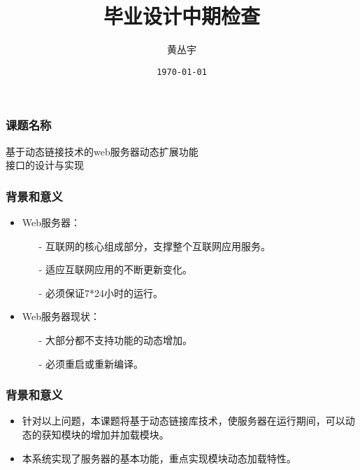 \documentclass[dvipdfm]{beamer}
\begin{document}
\title{毕业设计中期检查}
\author{黄丛宇}
\date{\texttt{\today}}

\begin{frame}	
	\titlepage
\end{frame}

\begin{frame}
	\frametitle{课题名称}	
	\begin{center}
	{\Large
			基于动态链接技术的{\cp web}服务器动态扩展功能\\
				接口的设计与实现
	}
	\end{center}
\end{frame}

\begin{frame}
	\frametitle{背景和意义}
	\begin{itemize}
		\item {\cp Web}服务器：
			\begin{itemize}
				\item[-] 互联网的核心组成部分，支撑整个互联网应用服务。
				\item[-] 适应互联网应用的不断更新变化。
				\item[-] 必须保证7*24小时的运行。
			\end{itemize}
		\pause
		\item {\cp Web}服务器现状：
			\begin{itemize}
				\item[-] 大部分都不支持功能的动态增加。
				\item[-] 必须重启或重新编译。
			\end{itemize}
	\end{itemize}
\end{frame}

\begin{frame}
	\frametitle{背景和意义}
	\begin{itemize}
		\item 针对以上问题，本课题将基于动态链接库技术，使服务器在运行期间，可以动态的获知模块的增加并加载模块。
		\pause
		\item 本系统实现了服务器的基本功能，重点实现模块动态加载特性。
	\end{itemize}
\end{frame}
\end{document}

